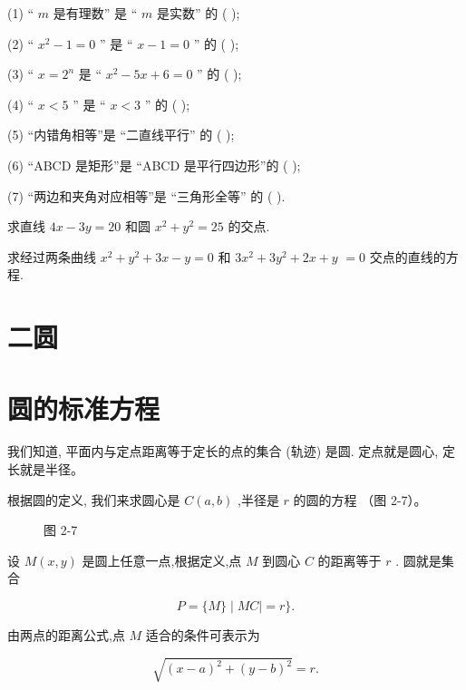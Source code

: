 \documentclass[lang=cn,newtx,12pt,scheme=chinese]{elegantbook}
\begin{document}
\begin{problemset}[习 题 四]
(1) “ \(m\) 是有理数” 是 “ \(m\) 是实数” 的 ( );

(2) “ \({x}^{2} - 1 = 0\) ” 是 “ \(x - 1 = 0\) ” 的 ( );

(3) “ \(x = {2}^{n}\) 是 “ \({x}^{2} - {5x} + 6 = 0\) ” 的 ( );

(4) “ \(x < 5\) ” 是 “ \(x < 3\) ” 的 ( );

(5) “内错角相等”是 “二直线平行” 的 ( );

(6) “ABCD 是矩形”是 “ABCD 是平行四边形”的 ( );

(7) “两边和夹角对应相等”是 “三角形全等” 的 ( ).

\item 求直线 \({4x} - {3y} = {20}\) 和圆 \({x}^{2} + {y}^{2} = {25}\) 的交点.

\item 求经过两条曲线 \({x}^{2} + {y}^{2} + {3x} - y = 0\) 和 \(3{x}^{2} + 3{y}^{2} + {2x} + y\) \(= 0\) 交点的直线的方程.
\end{problemset}

\section*{二\text{ }圆}

\section{圆的标准方程}

\begin{definition}[圆] 
我们知道, 平面内与定点距离等于定长的点的集合 (轨迹) 是圆. 定点就是圆心, 定长就是半径。
\end{definition}

根据圆的定义, 我们来求圆心是 \(C\left( {a,b}\right)\) ,半径是 \(r\) 的圆的方程 （图 2-7）。

\begin{figure}[h]
  \centering
  
  \caption{图 2-7}
\end{figure}

设 \(M\left( {x,y}\right)\) 是圆上任意一点,根据定义,点 \(M\) 到圆心 \(C\) 的距离等于 \(r\) . 圆就是集合

\[
  P = \{ M\} \mid {MC} \mid = r\} .
\]

由两点的距离公式,点 \(M\) 适合的条件可表示为

\[
  \sqrt{{\left( x - a\right) }^{2} + {\left( y - b\right) }^{2}} = r. \tag{1}
\]
\end{document}
